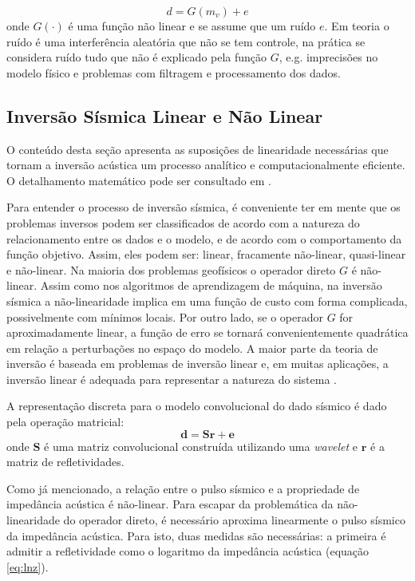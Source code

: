 \begin{equation}
d = G(m_v) + e
\end{equation}
onde $G(\cdot)$ é uma função não linear e se assume que um ruído $e$.
Em teoria o ruído é uma interferência aleatória que não se tem
controle, na prática se considera ruído tudo que não é explicado pela função
$G$, e.g. imprecisões no modelo físico e problemas com filtragem e processamento
dos dados.

\subsection{Inversão Sísmica Linear e Não Linear}
O conteúdo desta seção apresenta as suposições de linearidade necessárias
que tornam a inversão acústica um processo analítico e computacionalmente
eficiente. O detalhamento matemático pode ser consultado em \cite{Figueiredo2014}.

Para entender o processo de inversão sísmica, é conveniente ter em mente
que os problemas inversos podem ser classificados de acordo com a natureza
do relacionamento entre os dados e o modelo, e de acordo com o comportamento da função objetivo.
Assim, eles podem ser: linear, fracamente não-linear, quasi-linear e não-linear.
Na maioria dos problemas geofísicos o operador direto $G$ é não-linear.
Assim como nos algoritmos de aprendizagem de máquina, na inversão sísmica
a não-linearidade implica em uma função de custo com forma complicada,
possivelmente com mínimos locais.
Por outro lado, se o operador $G$ for aproximadamente linear, a
função de erro se tornará convenientemente quadrática em relação a perturbações
no espaço do modelo. A maior parte da teoria de inversão é baseada em problemas
de inversão linear e, em muitas aplicações, a inversão linear é 
adequada para representar a natureza do sistema \cite{sen_livro}.

A representação discreta para o modelo convolucional do dado sísmico é
dado pela operação matricial: 
\begin{equation}
\label{eq:sismDiscreta}
\mathbf{d = Sr + e}
\end{equation}
onde $\mathbf{S}$ é uma matriz convolucional construída utilizando uma
\textit{wavelet} e $\mathbf{r}$  é a matriz de refletividades.

Como já mencionado, a relação entre o pulso sísmico e a
propriedade de impedância acústica é não-linear.
Para escapar da problemática da não-linearidade do operador direto, é
necessário aproxima linearmente o pulso sísmico da impedância acústica.
Para isto, duas medidas são necessárias: a primeira é admitir a 
refletividade como o logaritmo da impedância acústica (equação \ref{eq:lnz}).

